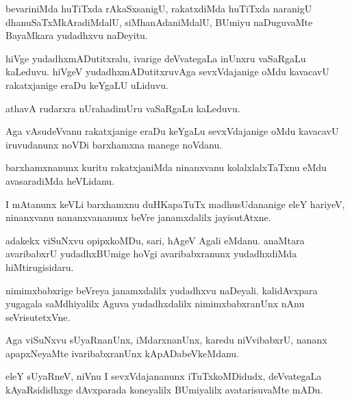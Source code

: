 \documentclass{article}
\begin{document}
\begin{mn}
bevariniMda huTiTxda rAkaSxsanigU, rakatxdiMda huTiTxda naranigU
dhanuSaTxMkAradiMdalU, siMhanAdaniMdalU, BUmiyu naDuguvaMte BayaMkara
yudadhxvu naDeyitu.
\end{mn}

\begin{mn}%
hiVge yudadhxmADutitxralu, ivarige deVvategaLa inUnxru vaSaRgaLu
kaLeduvu. hiVgeV yudadhxmADutitxruvAga sevxVdajanige oMdu kavacavU
rakatxjanige eraDu keYgaLU uLiduvu.
\end{mn}

\begin{mn}
athavA rudarxra nUrahadimUru vaSaRgaLu kaLeduvu.
\end{mn}

\begin{mn}
Aga vAsudeVvanu rakatxjanige eraDu keYgaLu sevxVdajanige oMdu kavacavU
iruvudanunx noVDi barxhamxna manege noVdanu.
\end{mn}

\begin{mn}
barxhamxnanunx kuritu rakatxjaniMda ninanxvanu kolalxlalxTaTxnu eMdu
avasaradiMda heVLidanu.
\end{mn}

\begin{mn}
I mAtanunx keVLi barxhamxnu duHKapaTuTx madhusUdananige eleY hariyeV,
ninanxvanu nananxvananunx beVre janamxdalilx jayisutAtxne.
\end{mn}

\begin{mn}
adakekx viSuNxvu opipxkoMDu, sari, hAgeV Agali eMdanu. anaMtara
avaribabxrU yudadhxBUmige hoVgi avaribabxranunx yudadhxdiMda hiMtirugisidaru.
\end{mn}

\begin{mn}%
nimimxbabxrige beVreya janamxdalilx yudadhxvu naDeyali. kalidAvxpara
yugagala saMdhiyalilx Aguva yudadhxdalilx nimimxbabxranUnx nAnu seVrisutetxVne.
\end{mn}

\begin{mn}
Aga viSuNxvu sUyaRnanUnx, iMdarxnanUnx, karedu niVvibabxrU, nananx
apapxNeyaMte ivaribabxranUnx kApADabeVkeMdanu.
\end{mn}

\begin{mn}
eleY sUyaRneV, niVnu I sevxVdajananunx iTuTxkoMDidudx, deVvategaLa
kAyaRsididhxge dAvxparada koneyalilx BUmiyalilx avatarisuvaMte mADu.
\end{mn}
\end{document}
